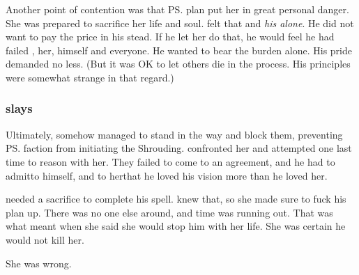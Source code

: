 Another point of contention was that \ps{\Rystessakhin} plan put her in great personal danger. 
She was prepared to sacrifice her life and soul. 
\Ishnaruchaefir{} felt that  and \emph{his alone}. 
He did not want \Rystessakhin{} to pay the price in his stead. 
If he let her do that, he would feel he had failed \Nexagglachel, her, himself and everyone. 
He wanted to bear the burden alone. 
His pride demanded no less. 
(But it was OK to let others die in the process. 
His principles were somewhat strange in that regard.)





\subsubsection{\Ishnaruchaefir{} slays \Rystessakhin}
Ultimately, \Rystessakhin{} somehow managed to stand in the way and block them, preventing \ps{\Ishnaruchaefir} faction from initiating the Shrouding. 
\Ishnaruchaefir{} confronted her and attempted one last time to reason with her. 
They failed to come to an agreement, and he had to admit\dash to himself, and to her\dash that he loved his vision more than he loved her. 

\Ishnaruchaefir needed a sacrifice to complete his spell. 
\Rystessakhin knew that, so she made sure to fuck his plan up.
There was no one else around, and time was running out. 
That was what \Rystessakhin meant when she said she would stop him with her life.
She was certain he would not kill her. 

She was wrong. 

